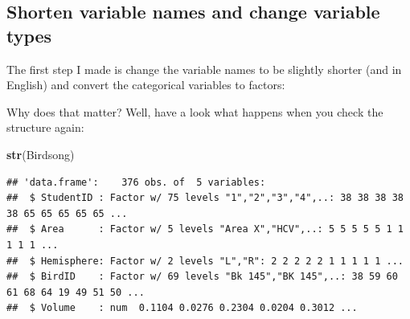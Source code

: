 \documentclass[
]{book}
\newenvironment{Shaded}{\begin{snugshade}}{\end{snugshade}}
\newcommand{\KeywordTok}[1]{\textcolor[rgb]{0.13,0.29,0.53}{\textbf{#1}}}
\newcommand{\NormalTok}[1]{#1}
\newcommand{\OperatorTok}[1]{\textcolor[rgb]{0.81,0.36,0.00}{\textbf{#1}}}
\newcommand{\StringTok}[1]{\textcolor[rgb]{0.31,0.60,0.02}{#1}}
\begin{document}
\hypertarget{shorten-variable-names-and-change-variable-types}{%
\subsection{Shorten variable names and change variable types}\label{shorten-variable-names-and-change-variable-types}}

The first step I made is change the variable names to be slightly shorter (and in English) and convert the categorical variables to factors:

\begin{Shaded}
\end{Shaded}

Why does that matter? Well, have a look what happens when you check the structure again:

\begin{Shaded}
\begin{Highlighting}[]
\KeywordTok{str}\NormalTok{(Birdsong)}
\end{Highlighting}
\end{Shaded}

\begin{verbatim}
## 'data.frame':    376 obs. of  5 variables:
##  $ StudentID : Factor w/ 75 levels "1","2","3","4",..: 38 38 38 38 38 65 65 65 65 65 ...
##  $ Area      : Factor w/ 5 levels "Area X","HCV",..: 5 5 5 5 5 1 1 1 1 1 ...
##  $ Hemisphere: Factor w/ 2 levels "L","R": 2 2 2 2 2 1 1 1 1 1 ...
##  $ BirdID    : Factor w/ 69 levels "Bk 145","BK 145",..: 38 59 60 61 68 64 19 49 51 50 ...
##  $ Volume    : num  0.1104 0.0276 0.2304 0.0204 0.3012 ...
\end{verbatim}
\end{document}
